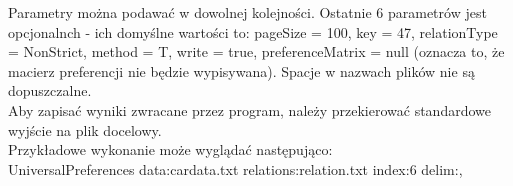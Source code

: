 \documentclass[a4paper,12pt]{article}
\begin{document}
Parametry można podawać w dowolnej kolejności. Ostatnie 6 parametrów jest opcjonalnch - ich domyślne wartości to: pageSize = 100, key = 47, relationType = NonStrict, method = T, write = true, preferenceMatrix = null (oznacza to, że macierz preferencji nie będzie wypisywana). Spacje w nazwach plików nie są dopuszczalne.\\

Aby zapisać wyniki zwracane przez program, należy przekierować standardowe wyjście na plik docelowy.\\

Przykładowe wykonanie może wyglądać następująco:\\

UniversalPreferences data:cardata.txt relations:relation.txt index:6 delim:,


% 
% 
\end{document}
